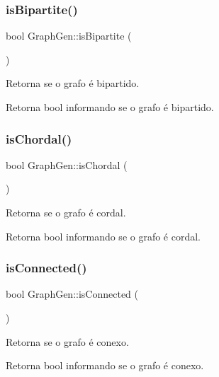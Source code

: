 \subsubsection{\texorpdfstring{is\+Bipartite()}{isBipartite()}}
{\footnotesize\ttfamily bool Graph\+Gen\+::is\+Bipartite (\begin{DoxyParamCaption}{ }\end{DoxyParamCaption})}

Retorna se o grafo é bipartido. \begin{DoxyReturn}{Retorna}
bool informando se o grafo é bipartido. 
\end{DoxyReturn}
\mbox{\label{classGraphGen_aac3e93061f340c6855aa54ed73922f47}} 
\subsubsection{\texorpdfstring{is\+Chordal()}{isChordal()}}
{\footnotesize\ttfamily bool Graph\+Gen\+::is\+Chordal (\begin{DoxyParamCaption}{ }\end{DoxyParamCaption})}

Retorna se o grafo é cordal. \begin{DoxyReturn}{Retorna}
bool informando se o grafo é cordal. 
\end{DoxyReturn}
\mbox{\label{classGraphGen_addc27f1b1daa452bb0943c867b550906}} 
\subsubsection{\texorpdfstring{is\+Connected()}{isConnected()}}
{\footnotesize\ttfamily bool Graph\+Gen\+::is\+Connected (\begin{DoxyParamCaption}{ }\end{DoxyParamCaption})}

Retorna se o grafo é conexo. \begin{DoxyReturn}{Retorna}
bool informando se o grafo é conexo. 
\end{DoxyReturn}
\mbox{\label{classGraphGen_ab4923b690b5fe013f35377b849bb6609}} 
